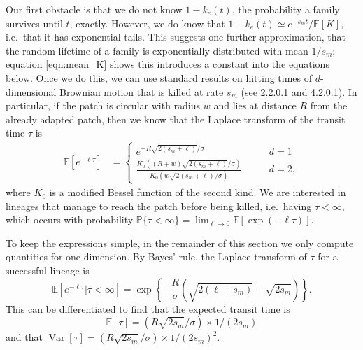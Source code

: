 \documentclass{article}
\newcommand{\citet}[1]{\cite{#1}}
\DeclareMathOperator{\var}{Var}
\renewcommand{\P}{\mathbb{P}}
\newcommand{\E}{\mathbb{E}}
\newcommand{\plr}[1]{{\it\color{blue}(#1)}}
\begin{document}
Our first obstacle is that we do not know $1-k_e(t)$, 
the probability a family survives until $t$, exactly.
However, we do know that $1-k_e(t) \simeq e^{-s_m t} / \E[K]$,
i.e.\ that it has exponential tails.
This suggests one further approximation, 
that the random lifetime of a family is exponentially distributed with mean $1/s_m$;
equation \eqref{eqn:mean_K} shows this introduces a constant into the equations below. 
Once we do this, 
we can use standard results on hitting times of $d$-dimensional Brownian motion
that is killed at rate $s_m$ (see \citet{borodin2002handbook} 2.2.0.1 and 4.2.0.1).
In particular, if the patch is circular with radius $w$ and lies at distance
$R$ from the already adapted patch, then 
we know that the Laplace transform of the transit time $\tau$ is
\begin{align}
  \E[e^{-\ell \tau}] &=
    \begin{cases}
      e^{- R \sqrt{2(s_m+\ell)}/\sigma} \qquad & d=1 \\
      \frac{ K_0( (R+w)\sqrt{2(s_m+\ell)}/\sigma) }{ K_0( w\sqrt{2(s_m+\ell)}/\sigma) } \qquad & d=2  ,
    \end{cases} \label{eqn:borodinresult}
\end{align}
where $K_0$ is a modified Bessel function of the second kind.
We are interested in lineages that manage to reach the patch before being killed,
i.e.\ having $\tau < \infty$,
which occurs with probability
$\P\{\tau < \infty\} = \lim_{\ell \to 0} \E \left[\exp(-\ell \tau) \right]$. 

To keep the expressions simple, in the remainder of this section we only compute quantities for one dimension.
By Bayes' rule, the Laplace transform of $\tau$ for a successful lineage is
\begin{equation} \label{eqn:haplen_cdf}
\E[e^{-\ell \tau}|\tau<\infty]  = \exp\left\{{-\frac{R}{\sigma}\left(\sqrt{2(\ell+s_m)} - \sqrt{2s_m}\right)}\right\} .
\end{equation}
This can be differentiated to find that the expected transit time is
\begin{equation} 
  \E[\tau] = (R\sqrt{2s_m}/\sigma)\times 1/(2s_m) \label{eqn:mean_tau}
\end{equation}
and that $\var[\tau] = (R\sqrt{2s_m}/\sigma) \times 1/(2s_m)^2$.


\end{document}

